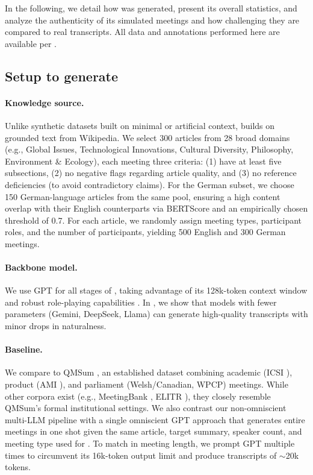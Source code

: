 \label{sec:data_insights}

In the following, we detail how \dataset{} was generated, present its overall statistics, and analyze the authenticity of its simulated meetings and how challenging they are compared to real transcripts.
All data and annotations performed here are available per .


\subsection{Setup to generate \dataset{}}

\paragraph{Knowledge source.} 
Unlike synthetic datasets built on minimal or artificial context, \dataset{} builds on grounded text from Wikipedia.
We select 300 articles from 28 broad domains (e.g., Global Issues, Technological Innovations, Cultural Diversity, Philosophy, Environment \& Ecology), each meeting three criteria: (1) have at least five subsections, (2) no negative flags regarding article quality, and (3) no reference deficiencies (to avoid contradictory claims).
For the German subset, we choose 150 German-language articles from the same pool, ensuring a high content overlap with their English counterparts via BERTScore \cite{ZhangKWW20} and an empirically chosen threshold of 0.7.
For each article, we randomly assign meeting types, participant roles, and the number of participants, yielding 500 English and 300 German meetings.


\paragraph{Backbone model.}
We use GPT \cite{OpenAIAAA24} for all stages of \pipeline{}, taking advantage of its 128k-token context window and robust role-playing capabilities \cite{KirsteinRKG24a}.
In , we show that models with fewer parameters (Gemini, DeepSeek, Llama) can generate high-quality transcripts with minor drops in naturalness.



\paragraph{Baseline.}
We compare \dataset{} to QMSum \cite{ZhongYYZ21h}, an established dataset combining academic (ICSI \cite{JaninBEE03}), product (AMI \cite{MccowanCKA05}), and parliament (Welsh/Canadian, WPCP) meetings.
While other corpora exist (e.g., MeetingBank \cite{HuGDD23a}, ELITR \cite{NedoluzhkoSHG22}), they closely resemble QMSum’s formal institutional settings.
We also contrast our non-omniscient multi-LLM pipeline with a single omniscient GPT approach \cite{ZhouSEK24} that generates entire meetings in one shot given the same article, target summary, speaker count, and meeting type used for \dataset{}.
To match in meeting length, we prompt GPT multiple times to circumvent its 16k-token output limit and produce transcripts of $\sim$20k tokens.



